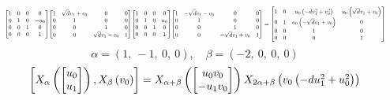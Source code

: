 \documentclass[11pt]{article}
\theoremstyle{definition}
\begin{document}
\[
\scaletoalign{\textwidth}{{\left[\begin{matrix}1 & 0 & 0 & 0\\0 & 1 & 0 & - u_{0}\\0 & 0 & 1 & 0\\0 & 0 & 0 & 1\end{matrix}\right]} {\left[\begin{matrix}1 & \sqrt{d} v_{1} + v_{0} & 0 & 0\\0 & 1 & 0 & 0\\0 & 0 & 1 & 0\\0 & 0 & \sqrt{d} v_{1} - v_{0} & 1\end{matrix}\right]} {\left[\begin{matrix}1 & 0 & 0 & 0\\0 & 1 & 0 & u_{0}\\0 & 0 & 1 & 0\\0 & 0 & 0 & 1\end{matrix}\right]} {\left[\begin{matrix}1 & - \sqrt{d} v_{1} - v_{0} & 0 & 0\\0 & 1 & 0 & 0\\0 & 0 & 1 & 0\\0 & 0 & - \sqrt{d} v_{1} + v_{0} & 1\end{matrix}\right]} = {\left[\begin{matrix}1 & 0 & u_{0} \left(- d v_{1}^{2} + v_{0}^{2}\right) & u_{0} \left(\sqrt{d} v_{1} + v_{0}\right)\\0 & 1 & u_{0} \left(- \sqrt{d} v_{1} + v_{0}\right) & 0\\0 & 0 & 1 & 0\\0 & 0 & 0 & 1\end{matrix}\right]}}
\]
\[
\alpha = \left( 1, \  -1, \  0, \  0\right), \quad \beta = \left( -2, \  0, \  0, \  0\right)
\]
\[
\scaletoalign{\textwidth}{\left[ X_{\alpha}\left(\left[\begin{matrix}u_{0}\\u_{1}\end{matrix}\right]\right), X_{\beta}\left(v_{0}\right) \right] = X_{\alpha + \beta}\left(\left[\begin{matrix}u_{0} v_{0}\\- u_{1} v_{0}\end{matrix}\right]\right) X_{2\alpha + \beta}\left(v_{0} \left(- d u_{1}^{2} + u_{0}^{2}\right)\right)}
\]
\end{document}
